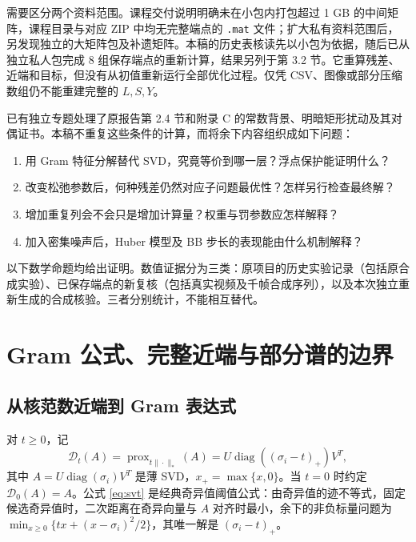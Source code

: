 \documentclass[UTF8,fontset=none,zihao=-4,a4paper]{ctexart}
\theoremstyle{plainzh}
\newcommand{\prox}{\operatorname{prox}}
\newcommand{\SVT}{\mathcal D}
\newcommand{\diag}{\operatorname{diag}}
\numberwithin{equation}{section}
\begin{document}
需要区分两个资料范围。课程交付说明明确未在小包内打包超过 1 GB 的中间矩阵，课程目录与对应 ZIP 中均无完整端点的 \texttt{.mat} 文件；扩大私有资料范围后，另发现独立的大矩阵包及补遗矩阵。本稿的历史表核读先以小包为依据，随后已从独立私人包完成 8 组保存端点的重新计算，结果另列于第 3.2 节。它重算残差、近端和目标，但没有从初值重新运行全部优化过程。仅凭 CSV、图像或部分压缩数组仍不能重建完整的 $L,S,Y$。

已有独立专题处理了原报告第 2.4 节和附录 C 的常数背景、明暗矩形扰动及其对偶证书。本稿不重复这些条件的计算，而将余下内容组织成如下问题：
\begin{enumerate}
\item 用 Gram 特征分解替代 SVD，究竟等价到哪一层？浮点保护能证明什么？
\item 改变松弛参数后，何种残差仍然对应子问题最优性？怎样另行检查最终解？
\item 增加重复列会不会只是增加计算量？权重与罚参数应怎样解释？
\item 加入密集噪声后，Huber 模型及 BB 步长的表现能由什么机制解释？
\end{enumerate}
以下数学命题均给出证明。数值证据分为三类：原项目的历史实验记录（包括原合成实验）、已保存端点的新复核（包括真实视频及千帧合成序列），以及本次独立重新生成的合成核验。三者分别统计，不能相互替代。

\section{Gram 公式、完整近端与部分谱的边界}
\subsection{从核范数近端到 Gram 表达式}
对 $t\geq0$，记
\begin{equation}\label{eq:svt}
\SVT_t(A)=\prox_{t\|\cdot\|_*}(A)
=U\diag((\sigma_i-t)_+)V^T,
\end{equation}
其中 $A=U\diag(\sigma_i)V^T$ 是薄 SVD，$x_+=\max\{x,0\}$。当 $t=0$ 时约定 $\SVT_0(A)=A$。公式 \eqref{eq:svt} 是经典奇异值阈值公式\cite{svt}：由奇异值的迹不等式，固定候选奇异值时，二次距离在奇异向量与 $A$ 对齐时最小，余下的非负标量问题为
$\min_{x\geq0}\{tx+(x-\sigma_i)^2/2\}$，其唯一解是 $(\sigma_i-t)_+$。
\end{document}
